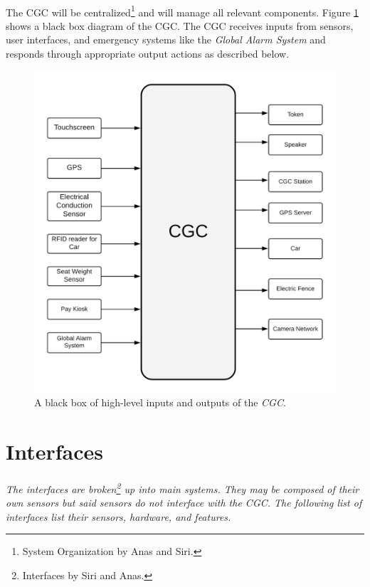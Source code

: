 \documentclass[12pt]{article}
\begin{document}
\paragraph{} The CGC will be centralized\footnote{System Organization 
by Anas and Siri.} and will manage all relevant components. Figure 
\ref{fig:blackbox} shows a black box diagram of the CGC. The CGC receives inputs 
from sensors, user interfaces, and emergency systems like the \textit{Global 
Alarm System} and responds through appropriate output actions as described 
below. 
\begin{figure}[H]
	\centerline{\includegraphics[scale=.20]{CGCBlackBox.png}}
	\caption{A black box of high-level inputs and outputs of the \textit{CGC}.}
	\label{fig:blackbox}
\end{figure}
\vfill
\pagebreak

\section{Interfaces}
\label{int}
\paragraph{} \textit{The interfaces are broken\footnote{Interfaces by Siri 
and Anas.} up into main systems. They may be composed of their own 
sensors but said sensors do not interface with the CGC. The following list of interfaces 
list their sensors, hardware, and features.}
\end{document}
